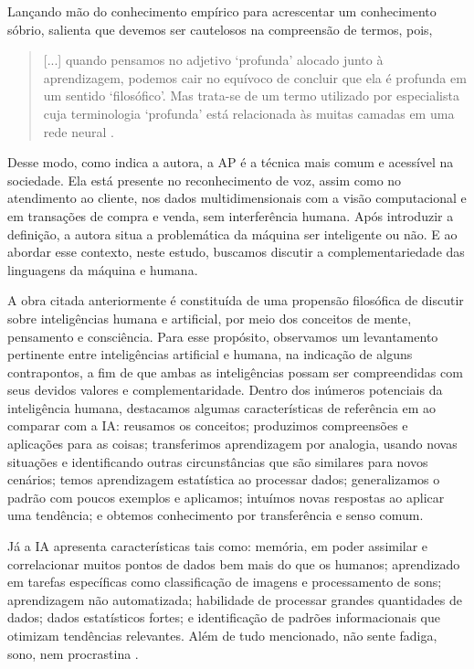 \documentclass[portuguese]{textolivre}
\begin{document}
Lançando mão do conhecimento empírico para acrescentar um conhecimento sóbrio, \textcite{santaella2023inteligencia} salienta que devemos ser cautelosos na compreensão de termos, pois,

\begin{quote}
    [...] quando pensamos no adjetivo ‘profunda’ alocado junto à aprendizagem, podemos cair no equívoco de concluir que ela é profunda em um sentido ‘filosófico’. Mas trata-se de um termo utilizado por especialista cuja terminologia ‘profunda’ está relacionada às muitas camadas em uma rede neural \cite[p. 174, grifos das autoras]{santaella2023inteligencia}.
\end{quote}

Desse modo, como indica a autora, a AP é a técnica mais comum e acessível na sociedade. Ela está presente no reconhecimento de voz, assim como no atendimento ao cliente, nos dados multidimensionais com a visão computacional e em transações de compra e venda, sem interferência humana. Após introduzir a definição, a autora situa a problemática da máquina ser inteligente ou não. E ao abordar esse contexto, neste estudo, buscamos discutir a complementariedade das linguagens da máquina e humana.

A obra citada anteriormente é constituída de uma propensão filosófica de discutir sobre inteligências humana e artificial, por meio dos conceitos de mente, pensamento e consciência. Para esse propósito, observamos um levantamento pertinente entre inteligências artificial e humana, na indicação de alguns contrapontos, a fim de que ambas as inteligências possam ser compreendidas com seus devidos valores e complementaridade. Dentro dos inúmeros potenciais da inteligência humana, destacamos algumas características de referência em \textcite{santaella2023inteligencia} ao comparar com a IA: reusamos os conceitos; produzimos compreensões e aplicações para as coisas; transferimos aprendizagem por analogia, usando novas situações e identificando outras circunstâncias que são similares para novos cenários; temos aprendizagem estatística ao processar dados; generalizamos o padrão com poucos exemplos e aplicamos; intuímos novas respostas ao aplicar uma tendência; e obtemos conhecimento por transferência e senso comum.

Já a IA apresenta características tais como: memória, em poder assimilar e correlacionar muitos pontos de dados bem mais do que os humanos; aprendizado em tarefas específicas como classificação de imagens e processamento de sons; aprendizagem não automatizada; habilidade de processar grandes quantidades de dados; dados estatísticos fortes; e identificação de padrões informacionais que otimizam tendências relevantes. Além de tudo mencionado, não sente fadiga, sono, nem procrastina \cite{kaufman2021, santaella2023inteligencia}.
\end{document}
